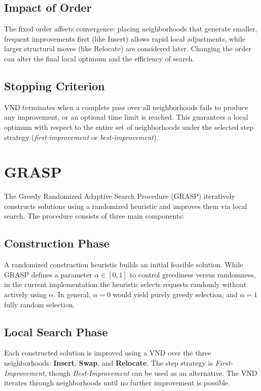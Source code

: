 \documentclass[a4paper]{scrartcl}
\begin{document}
\subsection{Impact of Order}
The fixed order affects convergence: placing neighborhoods that generate smaller, frequent improvements first (like Insert) allows rapid local adjustments, while larger structural moves (like Relocate) are considered later. Changing the order can alter the final local optimum and the efficiency of search.

\subsection{Stopping Criterion}
VND terminates when a complete pass over all neighborhoods fails to produce any improvement, or an optional time limit is reached. This guarantees a local optimum with respect to the entire set of neighborhoods under the selected step strategy (\textit{first-improvement} or \textit{best-improvement}).


\section{GRASP}

The Greedy Randomized Adaptive Search Procedure (GRASP) iteratively constructs solutions using a randomized heuristic and improves them via local search. The procedure consists of three main components:

\subsection{Construction Phase}
A randomized construction heuristic builds an initial feasible solution. While GRASP defines a parameter $\alpha \in [0,1]$ to control greediness versus randomness, in the current implementation the heuristic selects requests randomly without actively using $\alpha$. In general, $\alpha = 0$ would yield purely greedy selection, and $\alpha = 1$ fully random selection.

\subsection{Local Search Phase}
Each constructed solution is improved using a VND over the three neighborhoods: \textbf{Insert}, \textbf{Swap}, and \textbf{Relocate}. The step strategy is \textit{First-Improvement}, though \textit{Best-Improvement} can be used as an alternative. The VND iterates through neighborhoods until no further improvement is possible.
\end{document}

